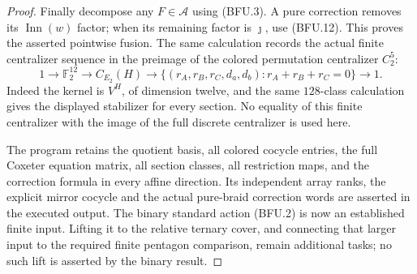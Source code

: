 \begin{proof}
Finally decompose any $F\in\mathcal A$ using (BFU.3).
A pure correction removes its $\operatorname{Inn}(w)$
factor; when its remaining factor is $\jmath$, use
(BFU.12).  This proves the asserted pointwise fusion.
The same calculation records the actual finite
centralizer sequence in the preimage of the colored
permutation centralizer $C_2^5$:
\[
 1\longrightarrow\mathbb F_2^{12}
   \longrightarrow C_{E_2}(H)
   \longrightarrow
   \{(r_A,r_B,r_C,d_a,d_b):r_A+r_B+r_C=0\}
   \longrightarrow1.
                                                               \tag{BFU.14}
\]
Indeed the kernel is $V^H$, of dimension twelve, and
the same $128$-class calculation gives the displayed
stabilizer for every section.  No equality of this
finite centralizer with the image of the full discrete
centralizer is used here.

The program
retains the quotient basis, all colored cocycle entries,
the full Coxeter equation matrix, all section classes,
all restriction maps, and the correction formula in
every affine direction.  Its independent array ranks,
the explicit mirror cocycle and the actual pure-braid
correction words are asserted in the executed output.
The binary standard action (BFU.2) is now an established
finite input.  Lifting it to the relative ternary cover,
and connecting that larger input to the required finite
pentagon comparison, remain additional tasks; no such
lift is asserted by the binary result.
\end{proof}
